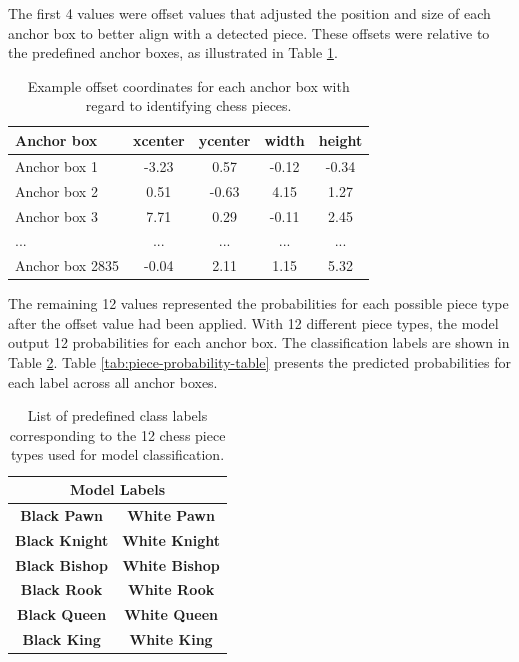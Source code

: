 The first 4 values were offset values that adjusted the position and size of each anchor box to better align with a detected piece. These offsets were relative to the predefined anchor boxes, as illustrated in Table \ref{tab:piece-offset-table}.

\begin{table}[h]
    \centering
    \caption[Offset values for anchor boxes (chess pieces)]{Example offset coordinates for each anchor box with regard to identifying chess pieces.}  %
    \renewcommand{\arraystretch}{1.3} %
    \begin{tabular}{lcccc}
        \toprule
        \textbf{Anchor box} & \textbf{xcenter} & \textbf{ycenter} & \textbf{width} & \textbf{height} \\
        \midrule
        Anchor box 1 & -3.23 & 0.57 & -0.12 & -0.34 \\
        Anchor box 2 & 0.51 & -0.63 & 4.15 & 1.27 \\
        Anchor box 3 & 7.71 & 0.29 & -0.11 & 2.45 \\
        ... & ... & ... & ... & ... \\
        Anchor box 2835 & -0.04 & 2.11 & 1.15 & 5.32 \\
        \bottomrule
    \end{tabular}
    \label{tab:piece-offset-table}
\end{table}


The remaining 12 values represented the probabilities for each possible piece type after the offset value had been applied. With 12 different piece types, the model output 12 probabilities for each anchor box. The classification labels are shown in Table \ref{tab:piece-label-table}. Table \ref{tab:piece-probability-table} presents the predicted probabilities for each label across all anchor boxes. \\

\vspace{2mm}

\begin{table}[ht]
\renewcommand{\arraystretch}{1.1}  %
\centering
\caption[Labels for chess piece types]{List of predefined class labels corresponding to the 12 chess piece types used for model classification.}
\begin{tabular}{|c|c|}
\hline
\multicolumn{2}{|c|}{\textbf{Model Labels}} \\  
\hline
\textbf{Black Pawn} & \textbf{White Pawn} \\
\textbf{Black Knight} & \textbf{White Knight} \\
\textbf{Black Bishop} & \textbf{White Bishop} \\
\textbf{Black Rook} & \textbf{White Rook} \\
\textbf{Black Queen} & \textbf{White Queen} \\
\textbf{Black King} & \textbf{White King} \\
\hline
\end{tabular}
\label{tab:piece-label-table}
\end{table}


